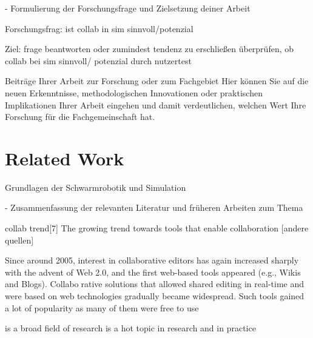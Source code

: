 \documentclass[german,version-2020-11]{uzl-thesis}
\begin{document}
%

- Formulierung der Forschungsfrage und Zielsetzung deiner Arbeit

      Forschungsfrag: ist collab in sim sinnvoll/potenzial

      Ziel: frage beantworten oder zumindest tendenz zu erschließen
        überprüfen, ob collab bei sim sinnvoll/ potenzial durch nutzertest


Beiträge Ihrer Arbeit zur Forschung oder zum Fachgebiet 
Hier können Sie auf die neuen Erkenntnisse, methodologischen Innovationen oder praktischen Implikationen Ihrer Arbeit 
eingehen und damit verdeutlichen, welchen Wert Ihre Forschung für die Fachgemeinschaft hat.


\section{Related Work}

%

Grundlagen der Schwarmrobotik und Simulation 

- Zusammenfassung der relevanten Literatur und früheren Arbeiten zum Thema

collab trend[7]
    The growing trend towards tools that enable collaboration [andere quellen]
    
    Since around 2005, interest in collaborative editors has again increased sharply with the advent of Web 2.0, and the first web-based tools appeared (e.g., Wikis and Blogs). Collaborative solutions that allowed shared editing in real-time and were based on web technologies gradually became widespread. Such tools gained a lot of popularity as many of them were free to use
    
    is a broad field of research
    is a hot topic in research and in practice
\end{document}
